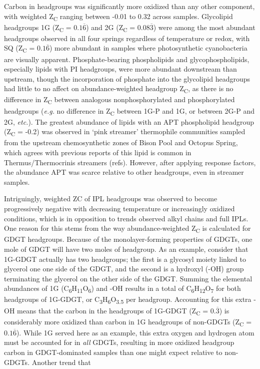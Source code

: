 Carbon in headgroups was significantly more oxidized than any other component, with weighted Z\textsubscript{C} ranging between -0.01 to 0.32 across samples. Glycolipid headgroups 1G (Z\textsubscript{C} = $0.1\overline{6}$) and 2G (Z\textsubscript{C} = $0.08\overline{3}$) were among the most abundant headgroups observed in all four springs regardless of temperature or redox, with SQ (Z\textsubscript{C} = $0.1\overline{6}$) more abundant in samples where photosynthetic cyanobacteria are visually apparent. Phosphate-bearing phospholipids and glycophospholipids, especially lipids with PI headgroups, were more abundant downstream than upstream, though the incorporation of phosphate into the glycolipid headgroups had little to no affect on abundance-weighted headgroup Z\textsubscript{C}, as there is no difference in Z\textsubscript{C} between analogous nonphosphorylated and phosphorylated headgroups (\textit{e.g.} no difference in Z\textsubscript{C} between 1G-P and 1G, or between 2G-P and 2G, \textit{etc.}). The greatest abundance of lipids with an APT phospholipid headgroup (Z\textsubscript{C} = -0.2) was observed in `pink streamer' thermophile communities sampled from the upstream chemosynthetic zones of Bison Pool and Octopus Spring, which agrees with previous reports of this lipid is common in Thermus/Thermocrinis streamers (refs). However, after applying response factors, the abundance APT was scarce relative to other headgroups, even in streamer samples.

Intriguingly, weighted ZC of IPL headgroups was observed to become progressively negative with decreasing temperature or increasingly oxidized conditions, which is in opposition to trends observed alkyl chains and full IPLs. One reason for this stems from the way abundance-weighted Z\textsubscript{C} is calculated for GDGT headgroups. Because of the monolayer-forming properties of GDGTs, one mole of GDGT will have two moles of headgroup. As an example, consider that 1G-GDGT actually has two headgroups; the first is a glycosyl moiety linked to glycerol one one side of the GDGT, and the second is a hydroxyl (-OH) group terminating the glycerol on the other side of the GDGT. Summing the elemental abundances of 1G (C\textsubscript{6}H\textsubscript{11}O\textsubscript{6}) and -OH results in a total of C\textsubscript{6}H\textsubscript{12}O\textsubscript{7} for both headgroups of 1G-GDGT, or C\textsubscript{3}H\textsubscript{6}O\textsubscript{3.5} per headgroup. Accounting for this extra -OH means that the carbon in the headgroups of 1G-GDGT (Z\textsubscript{C} = $0.\overline{3}$) is considerably more oxidized than carbon in 1G headgroups of non-GDGTs (Z\textsubscript{C} = $0.1\overline{6}$). While 1G served here as an example, this extra oxygen and hydrogen atom must be accounted for in \textit{all} GDGTs, resulting in more oxidized headgroup carbon in GDGT-dominated samples than one might expect relative to non-GDGTs. Another trend that 






